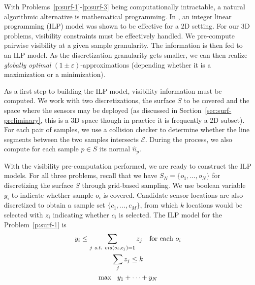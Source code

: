 With Problems~\ref{p:surf-1}-\ref{p:surf-3} being computationally intractable, a natural algorithmic alternative is mathematical programming. In \cite{fengyu2020optimally}, an integer linear programming (ILP) model was shown to be effective for a 2D setting. For our 3D problems, visibility constraints must be effectively handled. We pre-compute pairwise visibility at a given sample granularity. The information is then fed to an ILP model. As the discretization granularity gets smaller, we can then realize \emph{globally optimal} $(1\pm \varepsilon)$-approximations (depending whether it is a maximization or a minimization). 

As a first step to building the ILP model, visibility information must be computed. 
We work with two discretizations, the surface $S$ to be covered and the space where the sensors may be deployed (as discussed in Section~\ref{sec:surf-preliminary}, this is a 3D space though in practice it is frequently a 2D subset). For each pair of samples, we use a collision checker \cite{cgal:aabb-20b} to determine whether the line segments between the two samples intersects $\mathcal E$. During the process, we also compute for each sample $p\in S$ its normal $\hat{n}_p$.


%
With the visibility pre-computation performed, we are ready to construct the ILP models. For all three problems, recall that we have $S_N = \{o_1, \ldots, o_N\}$ for discretizing the surface $S$ through grid-based sampling. 
We use boolean variable $y_i$ to indicate whether sample $o_i$ is covered. 
Candidate sensor locations are also discretized to obtain a sample set $\{c_1, \ldots, c_M\}$, from which $k$ locations would be selected with $z_i$ indicating whether $c_i$ is selected. 
The ILP model for the Problem~\ref{p:surf-1} is
\begin{gather}
    y_i   \leq \sum_{j\ s.t.\ vis(o_i, c_j) = 1} z_j   \text{\quad for each } o_i\\
    \sum_j z_j \leq k\\
    \max\ \ y_1 + \dots + y_N
\end{gather}


